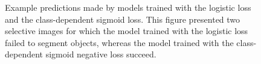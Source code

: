 \begin{figure}
\begin{minipage}{\columnwidth}
  \end{minipage}
\caption{
Example predictions made by models trained with the logistic loss and the class-dependent sigmoid loss.
This figure presented two selective images for which the model trained with the logistic loss failed to segment objects, whereas the model trained with the class-dependent sigmoid negative loss succeed.
}
\label{fig:pusegment}
\end{figure}
